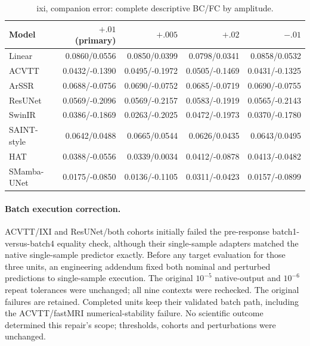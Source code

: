 \begin{table}[t]\centering\scriptsize

\caption{ixi, companion error: complete descriptive BC/FC by amplitude.}

\begin{tabular}{lrrrr}\toprule Model & $+.01$ (primary) & $+.005$ & $+.02$ & $-.01$\\\midrule

Linear & 0.0860/0.0556 & 0.0850/0.0399 & 0.0798/0.0341 & 0.0858/0.0532\\

ACVTT & 0.0432/-0.1390 & 0.0495/-0.1972 & 0.0505/-0.1469 & 0.0431/-0.1325\\

ArSSR & 0.0688/-0.0756 & 0.0690/-0.0752 & 0.0685/-0.0719 & 0.0690/-0.0755\\

ResUNet & 0.0569/-0.2096 & 0.0569/-0.2157 & 0.0583/-0.1919 & 0.0565/-0.2143\\

SwinIR & 0.0386/-0.1869 & 0.0263/-0.2025 & 0.0472/-0.1973 & 0.0370/-0.1780\\

SAINT-style & 0.0642/0.0488 & 0.0665/0.0544 & 0.0626/0.0435 & 0.0643/0.0495\\

HAT & 0.0388/-0.0556 & 0.0339/0.0034 & 0.0412/-0.0878 & 0.0413/-0.0482\\

SMamba-UNet & 0.0175/-0.0850 & 0.0136/-0.1105 & 0.0311/-0.0423 & 0.0157/-0.0899\\

\bottomrule\end{tabular}\end{table}

\paragraph{Batch execution correction.}
ACVTT/IXI and ResUNet/both cohorts initially failed the pre-response batch1-versus-batch4 equality check, although their single-sample adapters matched the native single-sample predictor exactly. Before any target evaluation for those three units, an engineering addendum fixed both nominal and perturbed predictions to single-sample execution. The original $10^{-5}$ native-output and $10^{-6}$ repeat tolerances were unchanged; all nine contexts were rechecked. The original failures are retained. Completed units keep their validated batch path, including the ACVTT/fastMRI numerical-stability failure. No scientific outcome determined this repair's scope; thresholds, cohorts and perturbations were unchanged.

